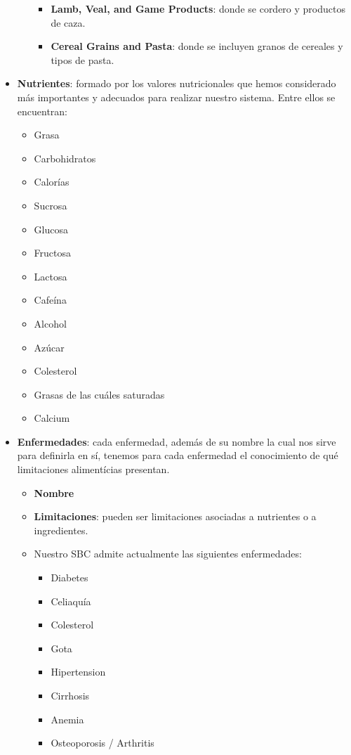 \documentclass[11]{article}
\begin{document}
\begin{itemize}
\begin{itemize}
\begin{itemize}
			\item \textbf{Lamb, Veal, and Game Products}: donde se cordero y productos de caza.
			\item \textbf{Cereal Grains and Pasta}: donde se incluyen granos de cereales y tipos de pasta.
			\end{itemize}
		\end{itemize}
	\item \textbf{Nutrientes}: formado por los valores nutricionales que hemos considerado más importantes y adecuados para realizar nuestro sistema. Entre ellos se encuentran: 
	\begin{itemize} 
		\item Grasa
		\item Carbohidratos
		\item Calorías
		\item Sucrosa
		\item Glucosa
		\item Fructosa
		\item Lactosa
		\item Cafeína
		\item Alcohol
		\item Azúcar
		\item Colesterol
		\item Grasas de las cuáles saturadas
		\item Calcium
	\end{itemize}


\item \textbf{Enfermedades}: cada enfermedad, además de su nombre la cual nos sirve para definirla en sí, tenemos para cada enfermedad el conocimiento de qué limitaciones alimentícias presentan. \begin{itemize}
	\item \textbf{Nombre}
	\item \textbf{Limitaciones}: pueden ser limitaciones asociadas a nutrientes o a ingredientes.
	\item Nuestro SBC admite actualmente las siguientes enfermedades:
		\begin{itemize}
		\item Diabetes
		\item Celiaquía
		\item Colesterol
		\item Gota
		\item Hipertension
		\item Cirrhosis
		\item Anemia
		\item Osteoporosis / Arthritis
		\end{itemize}
\end{itemize}
\end{itemize}
\end{document}
